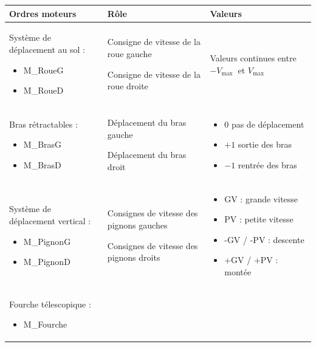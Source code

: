 \begin{table}[!h]

\begin{tabular}{p{.3\linewidth}p{.3\linewidth}m{.3\linewidth}}
\hline
\textbf{Ordres moteurs} & \textbf{Rôle} & \textbf{Valeurs} \\
\hline
Système de déplacement au sol : 
\begin{itemize}
\item M\_RoueG 
\item M\_RoueD 
\end{itemize}
& 
Consigne de vitesse de la roue gauche 

Consigne de vitesse de la roue droite 
 
 & 
Valeurs continues entre $-V_{\text {max }}$ et $V_{\text{max}}$ 

\\ \hline

Bras rétractables : 
\begin{itemize}
\item M\_BrasG 
\item M\_BrasD 
\end{itemize}
&
Déplacement du bras gauche 

Déplacement du bras droit 
&

\begin{itemize}
\item 0 pas de déplacement 
\item $+1$ sortie des bras 
\item $-1$ rentrée des bras 
\end{itemize}
\\ \hline

Système de déplacement vertical :
\begin{itemize}
\item M\_PignonG 
\item M\_PignonD 
\end{itemize}
&

Consignes de vitesse des pignons gauches 

Consignes de vitesse des pignons droits 

&
\begin{itemize}
\item GV : grande vitesse 
\item PV : petite vitesse 
\item -GV / -PV : descente
\item +GV / +PV : montée 
\end{itemize}
\\ \hline
Fourche télescopique :
\begin{itemize}
\item 
 M\_Fourche 
 \end{itemize}


\end{tabular}
\end{table}
